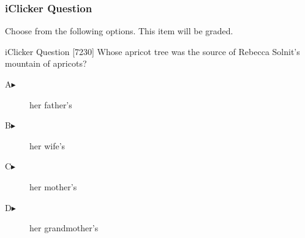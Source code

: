 \begin{frame}
  \frametitle{iClicker Question}
Choose from the following options. This item will be graded.
\begin{block}{iClicker Question}
[7230] Whose apricot tree was the source of Rebecca Solnit's mountain of apricots?
\end{block}
\begin{description}
\item[A\hspace{.2in}$\blacktriangleright$] her father's
\item[B\hspace{.2in}$\blacktriangleright$] her wife's
\item[C\hspace{.2in}$\blacktriangleright$] her mother's
\item[D\hspace{.2in}$\blacktriangleright$] her grandmother's
\end{description}
\end{frame}

